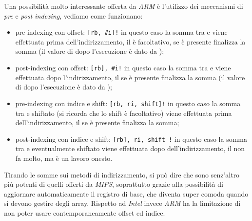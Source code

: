 \documentclass[class=book, crop=false, oneside]{standalone}
\begin{document}
Una possibilità molto interessante offerta da \emph{ARM} è l'utilizzo dei meccanismi di \emph{pre} e \emph{post indexing}, vediamo come funzionano:

\begin{itemize}
	\item pre-indexing con offset: \texttt{[rb, \#i]!} in questo caso la somma tra  e  viene  effettuata prima dell'indirizzamento, il \register{!} è facoltativo, se è presente finalizza la somma (il valore di  dopo l'esecuzione è dato da );
	\item post-indexing con offset: \texttt{[rb], \#i!} in questo caso la somma tra  e  viene effettuata dopo l'indirizzamento, il \suffix{!} se è presente finalizza la somma (il valore di  dopo l'esecuzione è dato da );
	\item pre-indexing con indice e shift: \texttt{[rb, ri, shift]!} in questo caso la somma tra  e  shiftato (si ricorda che lo shift è facoltativo) viene  effettuata prima dell'indirizzamento, il \suffix{!} se è presente finalizza la somma;
	\item post-indexing con indice e shift: \texttt{[rb], ri, shift !} in questo caso la somma tra  e  eventualmente shiftato viene effettuata dopo dell'indirizzamento, il \suffix{!} non fa molto, ma è un lavoro onesto.
\end{itemize}

Tirando le somme sui metodi di indirizzamento, si può dire che sono senz'altro più potenti di quelli offerti da \emph{MIPS}, soprattutto grazie alla possibilità di aggiornare automaticamente il registro di base, che diventa super comoda quando si devono gestire degli array. Rispetto ad \emph{Intel} invece \emph{ARM} ha la limitazione di non poter usare contemporaneamente offset ed indice.
\end{document}
